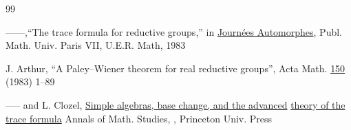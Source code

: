 \documentclass[12pt,letterpaper]{book}
\theoremstyle{plain}
\theoremstyle{definition}
\theoremstyle{remark}
\theoremstyle{remark}
\begin{document}
\begin{thebibliography}{99}




 ------,``The trace formula for reductive groups,'' in
\underline{Journ\'ees Automorphes}, Publ. Math. Univ. Paris VII,
U.E.R. Math, 1983


 J. Arthur, ``A Paley--Wiener theorem for real reductive
groups'', Acta Math. \underline{150} (1983) 1--89

 ----- and L. Clozel, \underline{Simple algebras,
base change, and the advanced} \underline{theory of the trace formula}
Annals of Math. Studies, , Princeton Univ. Press








\end{thebibliography}
\end{document}
